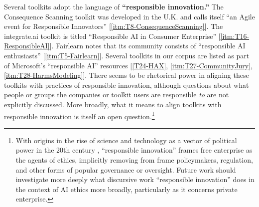 \documentclass[acmsmall]{acmart}
\begin{document}
Several toolkits adopt the language of \textbf{``responsible innovation.''}
The Consequence Scanning toolkit was developed in the U.K. and calls itself ``an Agile event for Responsible Innovators'' [\ref{itm:T8-ConsequenceScanning}]. The integrate.ai toolkit is titled ``Responsible AI in Consumer Enterprise'' [\ref{itm:T16-ResponsibleAI}]. Fairlearn notes that its community consists of ``responsible AI enthusiasts'' [\ref{itm:T5-Fairlearn}]. Several toolkits in our corpus are listed as part of Microsoft’s ``responsible AI'' resources [\ref{T24-HAX}, \ref{itm:T27-CommunityJury}, \ref{itm:T28-HarmsModeling}]. There seems to be rhetorical power in aligning these toolkits with practices of responsible innovation, although questions about what people or groups the companies or toolkit users are responsible \textit{to} are not explicitly discussed. More broadly, what it means to align toolkits with responsible innovation is itself an open question.\footnote{With origins in the rise of science and technology as a vector of political power in the 20th century \cite{STILGOE20131568}, ``responsible innovation'' frames free enterprise as the agents of ethics, implicitly removing from frame policymakers, regulation, and other forms of popular governance or oversight. Future work should investigate more deeply what discursive work ``responsible innovation'' does in the context of AI ethics more broadly, particularly as it concerns private enterprise.}
\end{document}
